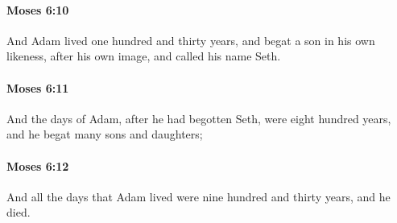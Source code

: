 		\paragraph{Moses 6:10} %
			\label{MOSES-6-10}

			And Adam lived one hundred and thirty years, and begat a son in his own likeness, after his own image, and called his name Seth.


		\paragraph{Moses 6:11} %
			\label{MOSES-6-11}

			And the days of Adam, after he had begotten Seth, were eight hundred years, and he begat many sons and daughters;


		\paragraph{Moses 6:12} %
			\label{MOSES-6-12}

			And all the days that Adam lived were nine hundred and thirty years, and he died.


